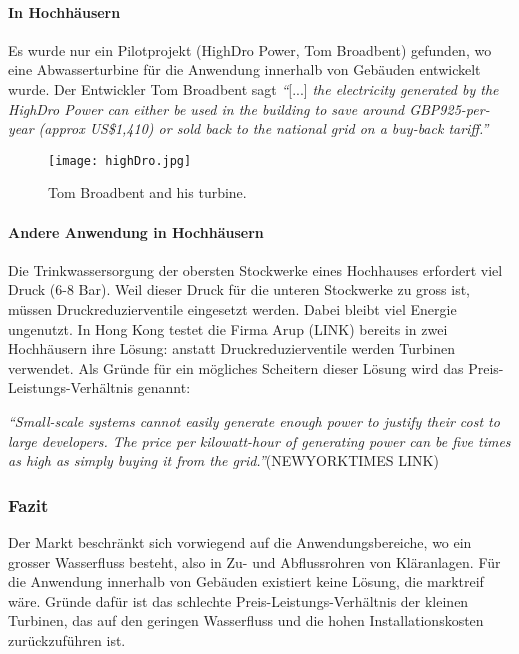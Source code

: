 \paragraph{In Hochhäusern}
Es wurde nur ein Pilotprojekt (HighDro Power, Tom Broadbent) gefunden, wo eine Abwasserturbine für die Anwendung innerhalb von Gebäuden entwickelt wurde. Der Entwickler Tom Broadbent sagt \textit{``}[...] \textit{the electricity generated by the HighDro Power can either be used in the building to save around GBP925-per-year (approx US\$1,410) or sold back to the national grid on a buy-back tariff.''}
\newpage
\begin{figure}
\centering
\texttt{[image: highDro.jpg]}
\caption{Tom Broadbent and his turbine.}
\label{fig:turbineTomBroadBent}
\end{figure}
\paragraph{Andere Anwendung in Hochhäusern}
Die Trinkwassersorgung der obersten Stockwerke eines Hochhauses erfordert viel Druck (6-8 Bar). Weil dieser Druck für die unteren Stockwerke zu gross ist, müssen Druckreduzierventile eingesetzt werden. Dabei bleibt viel Energie ungenutzt. In Hong Kong testet die Firma Arup (LINK) bereits in zwei Hochhäusern ihre Lösung: anstatt Druckreduzierventile werden Turbinen verwendet. Als Gründe für ein mögliches Scheitern dieser Lösung wird das Preis-Leistungs-Verhältnis genannt:

\textit{``Small-scale systems cannot easily generate enough power to justify their cost to large developers. The price per kilowatt-hour of generating power can be five times as high as simply buying it from the grid.''}(NEWYORKTIMES LINK)
\subsubsection{Fazit}
Der Markt beschränkt sich vorwiegend auf die Anwendungsbereiche, wo ein grosser Wasserfluss besteht, also in Zu- und Abflussrohren von Kläranlagen. Für die Anwendung innerhalb von Gebäuden existiert keine Lösung, die marktreif wäre. Gründe dafür ist das schlechte Preis-Leistungs-Verhältnis der kleinen Turbinen, das auf den geringen Wasserfluss und die hohen Installationskosten zurückzuführen ist.

